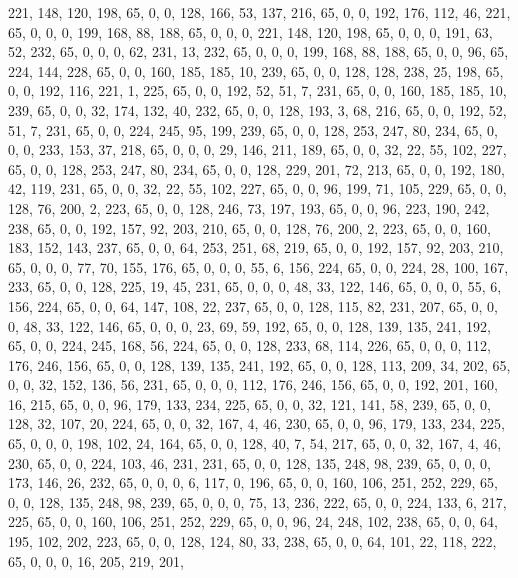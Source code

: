 \begin{DoxyCode}
       221, 148, 120, 198, 65, 0, 0, 128, 166, 53, 137, 216, 65, 0, 0, 192, 176, 112, 46, 221, 65, 0, 0, 0, 199,
       168, 88, 188, 65, 0, 0, 0, 221, 148, 120, 198, 65, 0, 0, 0, 191, 63, 52, 232, 65, 0, 0, 0, 62, 231, 13, 232,
       65, 0, 0, 0, 199, 168, 88, 188, 65, 0, 0, 96, 65, 224, 144, 228, 65, 0, 0, 160, 185, 185, 10, 239, 65, 0, 0,
       128, 128, 238, 25, 198, 65, 0, 0, 192, 116, 221, 1, 225, 65, 0, 0, 192, 52, 51, 7, 231, 65, 0, 0, 160, 185,
       185, 10, 239, 65, 0, 0, 32, 174, 132, 40, 232, 65, 0, 0, 128, 193, 3, 68, 216, 65, 0, 0, 192, 52, 51, 7,
       231, 65, 0, 0, 224, 245, 95, 199, 239, 65, 0, 0, 128, 253, 247, 80, 234, 65, 0, 0, 0, 233, 153, 37, 218, 65,
       0, 0, 0, 29, 146, 211, 189, 65, 0, 0, 32, 22, 55, 102, 227, 65, 0, 0, 128, 253, 247, 80, 234, 65, 0, 0, 128,
       229, 201, 72, 213, 65, 0, 0, 192, 180, 42, 119, 231, 65, 0, 0, 32, 22, 55, 102, 227, 65, 0, 0, 96, 199, 71,
       105, 229, 65, 0, 0, 128, 76, 200, 2, 223, 65, 0, 0, 128, 246, 73, 197, 193, 65, 0, 0, 96, 223, 190, 242,
       238, 65, 0, 0, 192, 157, 92, 203, 210, 65, 0, 0, 128, 76, 200, 2, 223, 65, 0, 0, 160, 183, 152, 143, 237, 65,
       0, 0, 64, 253, 251, 68, 219, 65, 0, 0, 192, 157, 92, 203, 210, 65, 0, 0, 0, 77, 70, 155, 176, 65, 0, 0, 0,
       55, 6, 156, 224, 65, 0, 0, 224, 28, 100, 167, 233, 65, 0, 0, 128, 225, 19, 45, 231, 65, 0, 0, 0, 48, 33, 122,
       146, 65, 0, 0, 0, 55, 6, 156, 224, 65, 0, 0, 64, 147, 108, 22, 237, 65, 0, 0, 128, 115, 82, 231, 207, 65, 0,
       0, 0, 48, 33, 122, 146, 65, 0, 0, 0, 23, 69, 59, 192, 65, 0, 0, 128, 139, 135, 241, 192, 65, 0, 0, 224,
       245, 168, 56, 224, 65, 0, 0, 128, 233, 68, 114, 226, 65, 0, 0, 0, 112, 176, 246, 156, 65, 0, 0, 128, 139, 135,
       241, 192, 65, 0, 0, 128, 113, 209, 34, 202, 65, 0, 0, 32, 152, 136, 56, 231, 65, 0, 0, 0, 112, 176, 246,
       156, 65, 0, 0, 192, 201, 160, 16, 215, 65, 0, 0, 96, 179, 133, 234, 225, 65, 0, 0, 32, 121, 141, 58, 239, 65,
       0, 0, 128, 32, 107, 20, 224, 65, 0, 0, 32, 167, 4, 46, 230, 65, 0, 0, 96, 179, 133, 234, 225, 65, 0, 0, 0,
       198, 102, 24, 164, 65, 0, 0, 128, 40, 7, 54, 217, 65, 0, 0, 32, 167, 4, 46, 230, 65, 0, 0, 224, 103, 46, 231,
       231, 65, 0, 0, 128, 135, 248, 98, 239, 65, 0, 0, 0, 173, 146, 26, 232, 65, 0, 0, 0, 6, 117, 0, 196, 65, 0,
       0, 160, 106, 251, 252, 229, 65, 0, 0, 128, 135, 248, 98, 239, 65, 0, 0, 0, 75, 13, 236, 222, 65, 0, 0, 224,
       133, 6, 217, 225, 65, 0, 0, 160, 106, 251, 252, 229, 65, 0, 0, 96, 24, 248, 102, 238, 65, 0, 0, 64, 195, 102,
       202, 223, 65, 0, 0, 128, 124, 80, 33, 238, 65, 0, 0, 64, 101, 22, 118, 222, 65, 0, 0, 0, 16, 205, 219, 201,

\end{DoxyCode}
